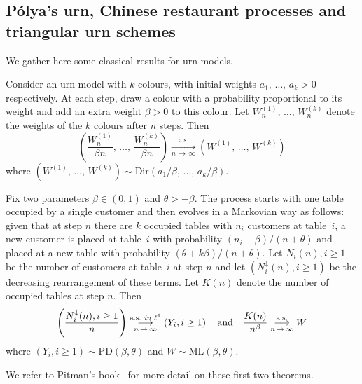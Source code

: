 \documentclass[AHL,Unicode,longabstracts,published]{cedram}
\newcommand{\ML}{\mathrm{ML}}
\newcommand{\PD}{\mathrm{PD}}
\newcommand{\Dir}{\mathrm{Dir}}
\begin{document}
\subsection{P\'olya's urn, Chinese restaurant processes and triangular urn schemes} \label{sec:urnproof}

We gather here some classical results for urn models.

\begin{theo}\label{thm:urn2}
Consider an urn model with $k$ colours, with initial weights $a_1,\,\ldots,\,a_k>0$ respectively. At each step, draw a colour with a probability proportional to its weight and add an extra weight $\beta>0$ to this colour. Let $W^{(1)}_n,\,\ldots,\,W^{(k)}_n$ denote the weights of the $k$ colours after $n$ steps. Then
\[
\left(\frac{W^{(1)}_n}{\beta n},\,\ldots,\,\frac{W^{(k)}_n}{\beta n}\right) \underset{n \,\rightarrow\,\infty}{\overset{\text{a.s.}}\longrightarrow} \left(W^{(1)},\,\ldots,\,W^{(k)}\right)
\]
where $(W^{(1)},\,\ldots,\,W^{(k)}) \sim \Dir(a_1/\beta,\,\ldots,\,a_k/\beta)$.
\end{theo}


\begin{theo}\label{thm:urn3}
Fix two parameters $\beta \in (0,1)$ and $\theta>-\beta$. The process starts with one table occupied by a single customer and then evolves in a Markovian way as follows: given that at step $n$ there are $k$ occupied tables with $n_i$ customers at table~$i$, a new customer is placed at table~$i$ with probability $(n_i-\beta)/(n+\theta)$ and placed at a new table with probability $(\theta+k\beta)/(n+\theta)$. Let $N_i(n),i\geq 1$ be the number of customers at table~$i$ at step $n$ and let $(N^{\downarrow}_i(n),i\geq 1)$ be the decreasing rearrangement of these terms. Let $K(n)$ denote the number of occupied tables at step $n$. Then
\[
\left(\frac{N^{\downarrow}_i(n),i \geq 1}{n}\right) \underset{n\,\rightarrow\,\infty}{\overset{\text{a.s.} \text{\emph{ in} }\ell^1}\longrightarrow} \left(Y_i,i\geq 1\right) \quad \text{and}\quad \frac{K(n)}{n^{\beta} } \underset{n \,\rightarrow\,\infty}{\overset{\text{a.s.}}\longrightarrow} W
\]
where $(Y_i,i\geq 1) \sim \PD(\beta,\theta)$ and $W \sim \ML(\beta,\theta)$.
\end{theo}

We refer to Pitman's book~\cite[Chapter~3]{PitmanStFl} for more detail on these first two theorems.
\end{document}
